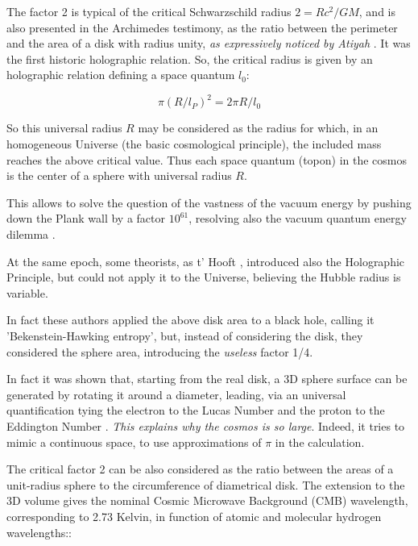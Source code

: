 \documentclass[a4paper,9pt]{article}
\begin{document}
 
    The factor 2 is typical of the critical Schwarzschild radius $2 = Rc^2/GM$, and is also presented in the Archimedes testimony, as the ratio between the perimeter and the area of a disk with radius unity, \textit {as expressively noticed by Atiyah }. It was the first historic holographic relation. So, the critical radius is given by an holographic relation defining a space quantum $l_0$:
    
    \begin{equation}
        \pi (R/l_P)^2 = 2\pi R/l_0
    \end{equation}
    
    So this universal radius $R$ may be considered as the radius for which, in an homogeneous Universe (the basic cosmological principle), the included mass reaches the above critical value\cite{Sanchez}. Thus each space quantum (topon) in the cosmos is the center of a sphere with universal radius $R$\cite{Maruani}.  
    
    
    This allows to solve the question of the vastness of the vacuum energy by pushing down the Plank wall by a factor $10^{61}$, resolving also the vacuum quantum energy dilemma  \cite{Sanchez} . 
    
    
    At the same epoch, some theorists, as t' Hooft \cite{Hooft}, introduced also the Holographic Principle, but could not apply it to the Universe, believing the Hubble radius is variable.
    
    
    In fact these authors applied the above disk area to a black hole, calling it 'Bekenstein-Hawking entropy'\cite{Bekenstein}, but, instead of considering the disk, they considered the sphere area, introducing the \textit{useless} factor 1/4. 
    
    
    In fact it was shown that, starting from the real disk, a 3D sphere surface can be generated by rotating it around a diameter, leading, via an universal quantification tying the electron to the Lucas Number and the proton to the Eddington Number \cite{Sanchez}. \textit {This explains why the cosmos is so large}. Indeed, it tries to mimic a continuous space, to use approximations of $\pi$ in  the calculation.
    
    
    The critical factor 2 can be also considered as the ratio between the areas of a unit-radius sphere to the circumference of diametrical disk. The extension to the 3D volume gives the nominal Cosmic Microwave Background (CMB) wavelength, corresponding to 2.73 Kelvin, in function of atomic and molecular hydrogen wavelengths:\cite{Sanchez}:
    
\end{document}
